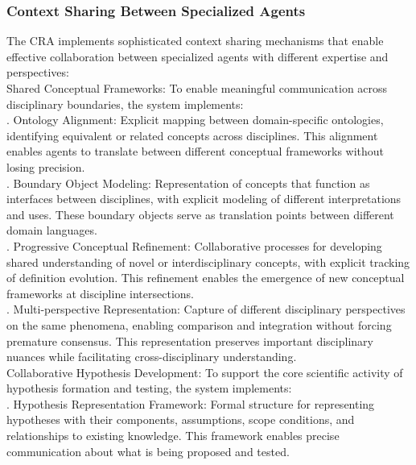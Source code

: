 \subsubsection{Context Sharing Between Specialized Agents}
The CRA implements sophisticated context sharing mechanisms that enable effective collaboration between specialized agents with different expertise and perspectives:\\ \newline
Shared Conceptual Frameworks: To enable meaningful communication across disciplinary boundaries, the system implements:\\ . Ontology Alignment: Explicit mapping between domain-specific ontologies, identifying equivalent or related concepts across disciplines. This alignment enables agents to translate between different conceptual frameworks without losing precision.\\ . Boundary Object Modeling: Representation of concepts that function as interfaces between disciplines, with explicit modeling of different interpretations and uses. These boundary objects serve as translation points between different domain languages.\\ . Progressive Conceptual Refinement: Collaborative processes for developing shared understanding of novel or interdisciplinary concepts, with explicit tracking of definition evolution. This refinement enables the emergence of new conceptual frameworks at discipline intersections.\\ . Multi-perspective Representation: Capture of different disciplinary perspectives on the same phenomena, enabling comparison and integration without forcing premature consensus. This representation preserves important disciplinary nuances while facilitating cross-disciplinary understanding.\\ \newline
Collaborative Hypothesis Development: To support the core scientific activity of hypothesis formation and testing, the system implements:\\ . Hypothesis Representation Framework: Formal structure for representing hypotheses with their components, assumptions, scope conditions, and relationships to existing knowledge. This framework enables precise communication about what is being proposed and tested.\\ \newline
